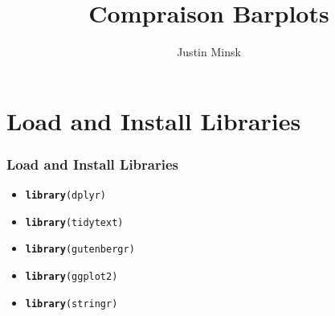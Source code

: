 \documentclass{beamer}\usepackage[]{graphicx}\usepackage[]{color}
\makeatletter
\newcommand{\hlstd}[1]{\textcolor[rgb]{0.345,0.345,0.345}{#1}}%
\newcommand{\hlkwd}[1]{\textcolor[rgb]{0.737,0.353,0.396}{\textbf{#1}}}%
\newenvironment{kframe}{%
 \def\at@end@of@kframe{}%
 \ifinner\ifhmode%
  \def\at@end@of@kframe{\end{minipage}}%
  \begin{minipage}{\columnwidth}%
 \fi\fi%
 \def\FrameCommand##1{\hskip\@totalleftmargin \hskip-\fboxsep
 \colorbox{shadecolor}{##1}\hskip-\fboxsep
     \hskip-\linewidth \hskip-\@totalleftmargin \hskip\columnwidth}%
 \MakeFramed {\advance\hsize-\width
   \@totalleftmargin\z@ \linewidth\hsize
   \@setminipage}}%
 {\par\unskip\endMakeFramed%
 \at@end@of@kframe}
\newenvironment{knitrout}{}{} %
\makeatother
\begin{document}
\title{Compraison Barplots}
\author{Justin Minsk}

\begin{frame}
  \titlepage
\end{frame}

\section{Load and Install Libraries}
\begin{frame}[fragile]
  \frametitle{Load and Install Libraries}
    \begin{itemize}
      \item<1->
\begin{knitrout}
\color{fgcolor}\begin{kframe}
\begin{alltt}
\hlkwd{library}\hlstd{(dplyr)}
\end{alltt}
\end{kframe}
\end{knitrout}
      \item<2->
\begin{knitrout}
\color{fgcolor}\begin{kframe}
\begin{alltt}
\hlkwd{library}\hlstd{(tidytext)}
\end{alltt}
\end{kframe}
\end{knitrout}
      \item<3->
\begin{knitrout}
\color{fgcolor}\begin{kframe}
\begin{alltt}
\hlkwd{library}\hlstd{(gutenbergr)}
\end{alltt}
\end{kframe}
\end{knitrout}
      \item<4->
\begin{knitrout}
\color{fgcolor}\begin{kframe}
\begin{alltt}
\hlkwd{library}\hlstd{(ggplot2)}
\end{alltt}
\end{kframe}
\end{knitrout}
      \item<5->
\begin{knitrout}
\color{fgcolor}\begin{kframe}
\begin{alltt}
\hlkwd{library}\hlstd{(stringr)}
\end{alltt}
\end{kframe}
\end{knitrout}
    \end{itemize}
\end{frame}
\end{document}
